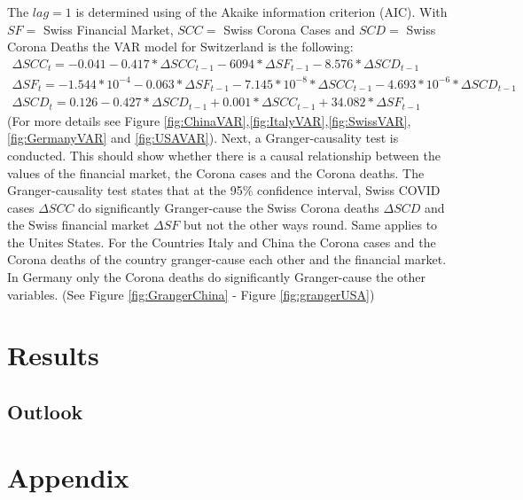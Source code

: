 \documentclass[11pt]{article}
\begin{document}
The $ lag = 1 $ is determined using of the Akaike information criterion (AIC). With $SF =$ Swiss Financial Market, $SCC =$ Swiss Corona Cases and $SCD =$ Swiss Corona Deaths the VAR model for Switzerland is the following:
$$
\begin{array}{l}
\Delta SCC_{t}= -0.041 - 0.417 * \Delta SCC_{t-1} - 6094 * \Delta SF_{t-1} -8.576 * \Delta SCD_{t-1}\\
\Delta SF_{t}= -1.544* 10^{-4}  - 0.063 * \Delta SF_{t-1} -7.145*10^{-8} * \Delta SCC_{t-1} - 4.693*10^{-6}  * \Delta SCD_{t-1}\\
\Delta SCD_{t}= 0.126 - 0.427 * \Delta SCD_{t-1} + 0.001 * \Delta SCC_{t-1} + 34.082  * \Delta SF_{t-1}
\end{array}
$$
(For more details see Figure \ref{fig:ChinaVAR},\ref{fig:ItalyVAR},\ref{fig:SwissVAR},\ref{fig:GermanyVAR} and \ref{fig:USAVAR}).
Next, a Granger-causality test is conducted. This should show whether there is a causal relationship between the values of the financial market, the Corona cases and the Corona deaths. The Granger-causality test states that at the 95\% confidence interval, Swiss COVID cases $\Delta SCC$ do significantly Granger-cause the Swiss Corona deaths $\Delta SCD$ and the Swiss financial market $\Delta SF$ but not the other ways round. Same applies to the Unites States. For the Countries Italy and China the Corona cases and the Corona deaths of the country granger-cause each other and the financial market. In Germany only the Corona deaths do significantly Granger-cause the other variables. (See Figure \ref{fig:GrangerChina} - Figure \ref{fig:grangerUSA})

\section{Results}



\subsection{Outlook}


\clearpage
\section{Appendix}
\end{document}
